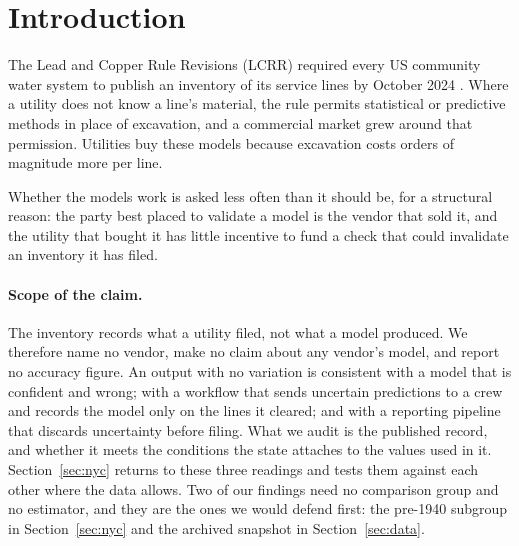 \documentclass[11pt]{article}
\newcommand{\KO}{\textsf{Known Other}}
\begin{document}
\begin{abstract}
The model-cleared population is genuinely newer, with a median year built of 1984 against
1930, and a spatial join to NYC MapPLUTO shows that construction era accounts for about a
third of the gap and not the rest. Holding era fixed, records-based classification, also a
desk method and applied to 532,906 addresses, finds lead in every era, at rates from 4.3\% to
31.9\%. Physical verification finds it in every era, from 1.5\% to 14.5\%. The predictive
model finds it in none. Six era-aware estimators across three method families put the expected
number of lead public-side lines among the model-cleared addresses at roughly 1,150 to 1,450.

Two findings need no comparison population. New York's own guidance permits \KO{} where
records show post-1986 construction; 7,782 of these addresses are in pre-1940 buildings and
the installation-date field is empty on all of them. And the archived 2025 snapshot shows the
public-side determination did not exist then: it was created by copying a customer-side model
output, for a different pipe with a different owner.
\end{abstract}

\section{Introduction}\label{sec:intro}

The Lead and Copper Rule Revisions (LCRR) required every US community water system to publish
an inventory of its service lines by October 2024 \cite{lcrr2021}. Where a utility does not
know a line's material, the rule permits statistical or predictive methods in place of
excavation, and a commercial market grew around that permission. Utilities buy these models
because excavation costs orders of magnitude more per line.

Whether the models work is asked less often than it should be, for a structural reason: the
party best placed to validate a model is the vendor that sold it, and the utility that bought
it has little incentive to fund a check that could invalidate an inventory it has filed.

\paragraph{Scope of the claim.}
The inventory records what a utility filed, not what a model produced. We therefore name no
vendor, make no claim about any vendor's model, and report no accuracy figure. An output with
no variation is consistent with a model that is confident and wrong; with a workflow that
sends uncertain predictions to a crew and records the model only on the lines it cleared; and
with a reporting pipeline that discards uncertainty before filing. What we audit is the
published record, and whether it meets the conditions the state attaches to the values used in
it. Section~\ref{sec:nyc} returns to these three readings and tests them against each other
where the data allows. Two of our findings need no comparison group and no estimator, and they
are the ones we would defend first: the pre-1940 subgroup in Section~\ref{sec:nyc} and the
archived snapshot in Section~\ref{sec:data}.
\end{document}
